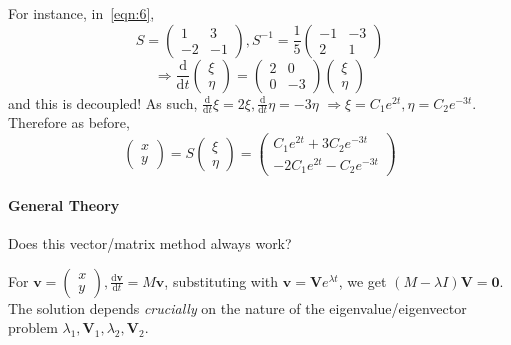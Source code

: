 \documentclass[12pt]{report}
\theoremstyle{definition}
\begin{document}
For instance, in~\eqref{eqn:6}, \[
    S = \begin{pmatrix}
        1 & 3 \\
        -2 & -1
    \end{pmatrix}, S^{-1} = \frac{1}{5} \begin{pmatrix}
        -1 & -3 \\
        2 & 1
    \end{pmatrix} 
\]\[
    \Rightarrow{}\frac{\mathrm{d}}{\mathrm{d}t} \begin{pmatrix}
            \xi \\
            \eta
    \end{pmatrix} = \begin{pmatrix}
    2 & 0 \\
    0 & -3
    \end{pmatrix} \begin{pmatrix}
            \xi \\
            \eta
    \end{pmatrix}
\]and this is decoupled!
As such, $\frac{\mathrm{d}}{\mathrm{d}t} \xi = 2\xi, \frac{\mathrm{d}}{\mathrm{d}t} \eta = -3\eta$
$\Rightarrow{}\xi = C_1 e^{2t}, \eta = C_2 e^{-3t}$. Therefore as before, \[
    \begin{pmatrix}
            x \\
            y
    \end{pmatrix}  = S\begin{pmatrix}
            \xi \\
            \eta
    \end{pmatrix} = \begin{pmatrix}
            C_1 e^{2t} + 3C_2 e^{-3t} \\
            -2C_1 e^{2t} - C_2 e^{-3t}
    \end{pmatrix} 
\]

\paragraph{General Theory}
Does this vector/matrix method always work?

For $\mathbf{v} = \begin{pmatrix}
        x \\
        y
\end{pmatrix} , \frac{\mathrm{d}\mathbf{v}}{\mathrm{d}t} = M\mathbf{v}$,
substituting with $\mathbf{v} = \mathbf{V}e^{\lambda t}$,
we get $(M - \lambda I)\mathbf{V} = \mathbf{0}$.
The solution depends \emph{crucially} on the nature of the eigenvalue/eigenvector problem
$\lambda_1, \mathbf{V}_1, \lambda_2, \mathbf{V}_2$.
\end{document}
